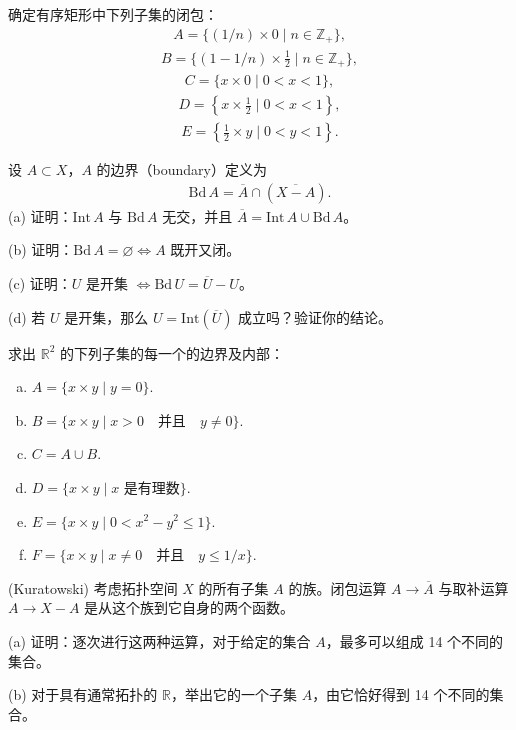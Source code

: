 \documentclass[../../main.tex]{subfiles}
\begin{document}
\begin{exercise}\label{exercise:ch02-闭集与极限点-18}
确定有序矩形中下列子集的闭包：
\begin{align*}
A = \{(1/n) \times 0 \mid n \in \mathbb{Z}_{+}\},
\end{align*}
\begin{align*}
B = \{(1 - 1/n) \times \frac{1}{2} \mid n \in \mathbb{Z}_{+}\},
\end{align*}
\begin{align*}
C = \{x \times 0 \mid 0 < x < 1\},
\end{align*}
\begin{align*}
D = \left\{x \times \frac{1}{2} \mid 0 < x < 1\right\},
\end{align*}
\begin{align*}
E = \left\{\frac{1}{2} \times y \mid 0 < y < 1\right\}.
\end{align*}
\end{exercise}

\begin{exercise}\label{exercise:ch02-闭集与极限点-19}
设 $A \subset X$，$A$ 的边界（boundary）定义为
\begin{align*}
\mathrm{Bd}\,A = \overline{A} \cap (\overline{X - A}).
\end{align*}
(a) 证明：$\mathrm{Int}\,A$ 与 $\mathrm{Bd}\,A$ 无交，并且 $\overline{A} = \mathrm{Int}\,A \cup \mathrm{Bd}\,A$。

(b) 证明：$\mathrm{Bd}\,A = \varnothing \Longleftrightarrow A$ 既开又闭。

(c) 证明：$U$ 是开集 $\Longleftrightarrow \mathrm{Bd}\,U = \overline{U} - U$。

(d) 若 $U$ 是开集，那么 $U = \mathrm{Int}(\overline{U})$ 成立吗？验证你的结论。
\end{exercise}

\begin{exercise}\label{exercise:ch02-闭集与极限点-20}
求出 $\mathbb{R}^{2}$ 的下列子集的每一个的边界及内部：
\begin{enumerate}[(a)]
\item $A = \{x \times y \mid y = 0\}$.
\item $B = \{x \times y \mid x > 0 \quad \text{并且} \quad y \neq 0\}$.
\item $C = A \cup B$.
\item $D = \{x \times y \mid x \text{ 是有理数}\}$.
\item $E = \{x \times y \mid 0 < x^{2} - y^{2} \leqslant 1\}$.
\item $F = \{x \times y \mid x \neq 0 \quad \text{并且} \quad y \leqslant 1/x\}$.
\end{enumerate}
\end{exercise}

\begin{exercise}\label{exercise:ch02-闭集与极限点-21}
(Kuratowski) 考虑拓扑空间 $X$ 的所有子集 $A$ 的族。闭包运算 $A \rightarrow \overline{A}$ 与取补运算 $A \rightarrow X - A$ 是从这个族到它自身的两个函数。

(a) 证明：逐次进行这两种运算，对于给定的集合 $A$，最多可以组成 14 个不同的集合。

(b) 对于具有通常拓扑的 $\mathbb{R}$，举出它的一个子集 $A$，由它恰好得到 14 个不同的集合。
\end{exercise}
\end{document}
